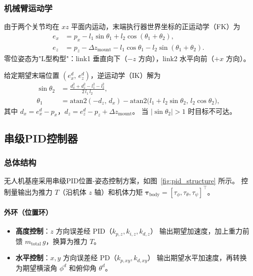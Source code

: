 \subsubsection{机械臂运动学}

由于两个关节均在 $xz$ 平面内运动，末端执行器世界坐标的正运动学（FK）为
\begin{align}
    e_x &= p_x - l_1\sin\theta_1 + l_2\cos(\theta_1+\theta_2), \label{eq:fk_x}\\
    e_z &= p_z - \Delta z_{\mathrm{mount}} - l_1\cos\theta_1 - l_2\sin(\theta_1+\theta_2). \label{eq:fk_z}
\end{align}
零位姿态为"L型构型"：link1 垂直向下（$-z$ 方向），link2 水平向前（$+x$ 方向）。

给定期望末端位置 $(e_x^d,\, e_z^d)$，逆运动学（IK）解为
\begin{align}
    \sin\theta_2 &= \frac{d_x^2 + d_z^2 - l_1^2 - l_2^2}{2\,l_1\,l_2}, \label{eq:ik_t2}\\
    \theta_1 &= \mathrm{atan2}(-d_z,\, d_x) - \mathrm{atan2}\!\bigl(l_1 + l_2\sin\theta_2,\, l_2\cos\theta_2\bigr), \label{eq:ik_t1}
\end{align}
其中 $d_x = e_x^d - p_x$，$d_z = e_z^d - p_z + \Delta z_{\mathrm{mount}}$。
当 $|\sin\theta_2|>1$ 时目标不可达。

\subsection{串级PID控制器}

\subsubsection{总体结构}

无人机基座采用串级PID位置-姿态控制方案，如图~\ref{fig:pid_structure} 所示。
控制量输出为推力 $T$（沿机体 $z$ 轴）和机体力矩 $\boldsymbol{\tau}_{\mathrm{body}}=[\tau_\phi,\tau_\theta,\tau_\psi]^\top$。

\paragraph{外环（位置环）}
\begin{itemize}
    \item \textbf{高度控制}：$z$ 方向误差经 PID（$k_{p,z},k_{i,z},k_{d,z}$）
          输出期望加速度，加上重力前馈 $m_{\mathrm{total}}\,g$，换算为推力 $T$。
    \item \textbf{水平控制}：$x,y$ 方向误差经 PD（$k_{p,xy},k_{d,xy}$）
          输出期望水平加速度，再转换为期望横滚角 $\phi^d$ 和俯仰角 $\theta^d$。
\end{itemize}

